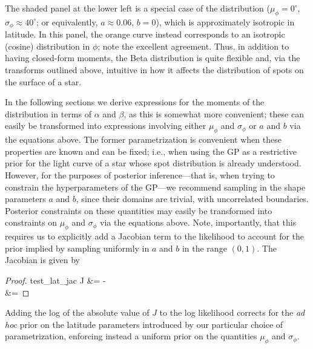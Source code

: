 \documentclass[modern]{aastex62}
\begin{document}
The shaded panel at the lower left is a special case of the distribution
($\mu_\phi = 0^\circ$, $\sigma_\phi \approx 40^\circ$; or equivalently,
$a \approx 0.06$, $b = 0$), which is approximately isotropic in latitude. In
this panel, the orange curve instead corresponds to an isotropic (cosine)
distribution in $\phi$; note the excellent agreement.
%
Thus, in addition to having closed-form moments, the Beta distribution is
quite flexible and, via the transforms outlined above, intuitive in how
it affects the distribution of spots on the surface of a star.

In the following sections we derive expressions
for the moments of the distribution in terms
of $\alpha$ and $\beta$, as this is somewhat more convenient; these
can easily be transformed into expressions involving either $\mu_\phi$ and $\sigma_\phi$
or $a$ and $b$ via the equations above. The former parametrization is convenient
when these properties are known and can be fixed; i.e., when using the GP as
a restrictive prior for the light curve of a star whose spot distribution is
already understood.
However, for the purposes of posterior inference---that is, when trying to
constrain the hyperparameters of the GP---we recommend sampling in the
shape parameters $a$ and $b$, since their domains are trivial,
with uncorrelated boundaries. Posterior constraints on these quantities may
easily be transformed into constraints on $\mu_\phi$ and $\sigma_\phi$
via the equations above. Note, importantly, that this
requires us to explicitly add a Jacobian term to the likelihood
to account for the prior implied by sampling uniformly in $a$ and $b$
in the range $(0, 1)$.
The Jacobian is given by
%
\begin{proof}{test_lat_jac}
    \label{eq:J}
    J &=
     -
    \\
    &=
    \nonumber
\end{proof}
%
Adding the log of the absolute value of $J$ to the log likelihood
corrects for the \emph{ad hoc}
prior on the latitude parameters introduced by our particular choice of
parametrization, enforcing instead a uniform prior on the quantities $\mu_\phi$
and $\sigma_\phi$.
\end{document}
